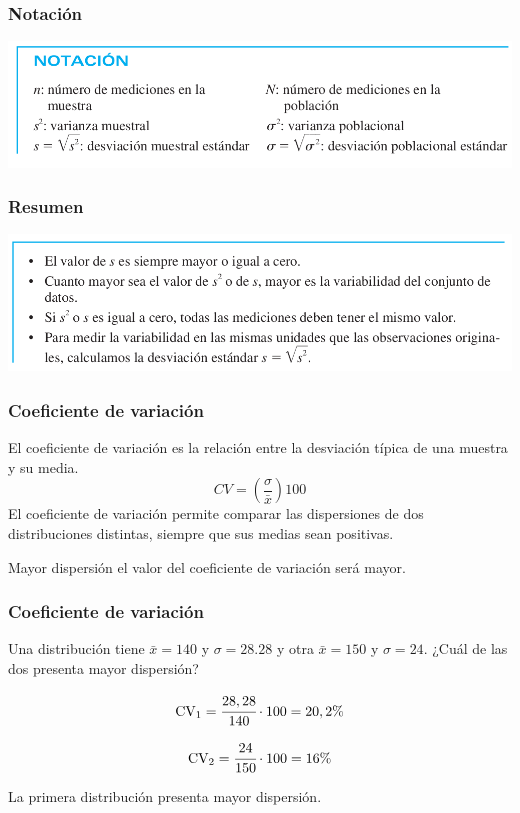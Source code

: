 \documentclass[spanish]{beamer}
\begin{document}
\begin{frame}
\frametitle{Notación}

\begin{center}
\includegraphics[width=\textwidth]{im15}
\end{center}

\end{frame}
\begin{frame}
\frametitle{Resumen}

\begin{center}
\includegraphics[width=\textwidth]{im16}
\end{center}

\end{frame}
\begin{frame}
\frametitle{Coeficiente de variación}
El coeficiente de variación es la relación entre la desviación típica de una muestra y su media.
\begin{equation*}
CV=\left( \frac{\sigma}{\bar{x}} \right) 100
\end{equation*}
El coeficiente de variación permite comparar las dispersiones de dos distribuciones distintas, siempre que sus medias sean positivas.

Mayor dispersión el valor del coeficiente de variación será mayor.
\end{frame}
\begin{frame}
\frametitle{Coeficiente de variación}
Una distribución tiene $\bar{x}=140$ y $\sigma =28.28$ y otra $\bar{x}=150$ y $\sigma =24$. ¿Cuál de las dos presenta mayor dispersión?

\begin{equation*}
\textup{CV}_{1}=\cfrac{28,28}{140}\cdot 100=20,2 \%
\end{equation*}
 
\begin{equation*}
\textup{CV}_{2}=\cfrac{24}{150}\cdot 100=16 \%
\end{equation*}
 
La primera distribución presenta mayor dispersión.

\end{frame}
\end{document}

